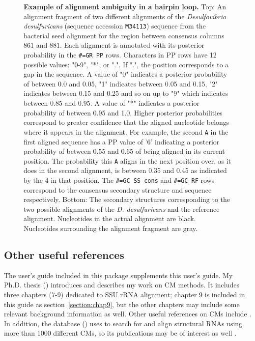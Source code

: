 \begin{figure}
\begin{center}
\caption[Example of alignment ambiguity in a hairpin loop.]{
  \textbf{Example of alignment ambiguity in a hairpin loop.}  Top: An
  alignment fragment of two different alignments of the
  \emph{Desulfovibrio desulfuricans} (sequence accession
  \texttt{M34113}) sequence from the  bacterial seed
  alignment for the region between consensus columns $861$ and $881$.
  Each alignment is annotated with its posterior probability in the
  \texttt{\#=GR PP} rows.  Characters in PP rows have 12 possible
  values: "0-9", "*", or ".". If ".", the position corresponds to a
  gap in the sequence. A value of "0" indicates a posterior
  probability of between 0.0 and 0.05, "1" indicates between 0.05 and
  0.15, "2" indicates between 0.15 and 0.25 and so on up to "9" which
  indicates between 0.85 and 0.95. A value of "*" indicates a
  posterior probability of between 0.95 and 1.0. Higher posterior
  probabilities correspond to greater confidence that the aligned
  nucleotide belongs where it appears in the alignment.  For example,
  the second \texttt{A} in the first aligned sequence has a PP value
  of '6' indicating a posterior probability of between 0.55 and 0.65
  of being aligned in its current position. The
  probability this \texttt{A} aligns in the next position over, as it
  does in the second alignment, is between 0.35 and 0.45 as indicated
  by the 4 in that position.  The \texttt{\#=GC
  SS\_cons} and \texttt{\#=GC RF} rows correspond to the consensus
  secondary structure and sequence respectively.  
  Bottom: The
  secondary structures corresponding to the two possible alignments of
  the \emph{D. desulfuricans} and the reference alignment.  Nucleotides
  in the actual alignment are black. Nucleotides surrounding the
  alignment fragment are gray.}
\end{center}
\label{fig:ambiguity}
\end{figure}


\subsection{Other useful references}

The  user's guide \cite{infernalguide} included in
this package supplements this user's guide. My Ph.D. thesis 
()
introduces and describes my work on CM methods. It includes three chapters (7-9) dedicated to
SSU rRNA alignment; chapter 9 is included in this guide as
section~\ref{section:chap9}, but the other chapters may include some
relevant background information as well. 
Other useful references on CMs include
\cite{Eddy94,Eddy02b,NawrockiEddy07,Nawrocki09,KolbeEddy09}. In
addition, the  database 
()
uses  to search for and align
structural RNAs using more than 1000 different CMs, so its
publications may be of interest as well
\cite{Griffiths-Jones03,Griffiths-Jones05,Gardner09}.

